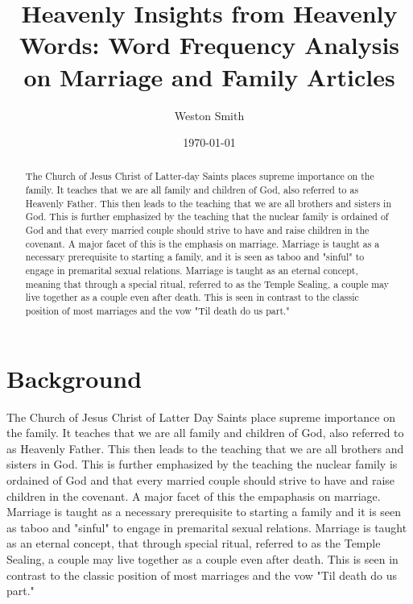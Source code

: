 \documentclass[twocolumn]{article}
\title{Heavenly Insights from Heavenly Words: Word Frequency Analysis on Marriage and Family Articles}
\author[1]{Weston Smith}
\affil{wms29@byu.edu}
\date{\today}
\begin{document}
\newcommand{\church}{The Church of Jesus Christ of Latter-day Saints }

\maketitle

\begin{abstract}
    The Church of Jesus Christ of Latter-day Saints places supreme importance on the family. 
    It teaches that we are all family and children of God, also referred to as Heavenly Father. This then leads to the teaching that we are all brothers and sisters in God. This is further emphasized by the teaching that the nuclear family is ordained of God and that every married couple should strive to have and raise children in the covenant. A major facet of this is the emphasis on marriage. Marriage is taught as a necessary prerequisite to starting a family, and it is seen as taboo and "sinful" to engage in premarital sexual relations. Marriage is taught as an eternal concept, meaning that through a special ritual, referred to as the Temple Sealing, a couple may live together as a couple even after death. 
    This is seen in contrast to the classic position of most marriages and the vow "Til death do us part."

\end{abstract}

\section{Background}
The Church of Jesus Christ of Latter Day Saints place supreme importance on the family. It teaches that we are all family and children of God, also referred to as Heavenly Father. This then leads to the teaching that we are all brothers and sisters in God. This is further emphasized by the teaching the nuclear family is ordained of God and that every married couple should strive to have and raise children in the covenant. A major facet of this the empaphasis on marriage. Marriage is taught as a necessary prerequisite to starting a family and it is seen as taboo and "sinful" to engage in premarital sexual relations. Marriage is taught as an eternal concept, that through special ritual, referred to as the Temple Sealing, a couple may live together as a couple even after death. This is seen in contrast to the classic position of most marriages and the vow "Til death do us part."
\end{document}
